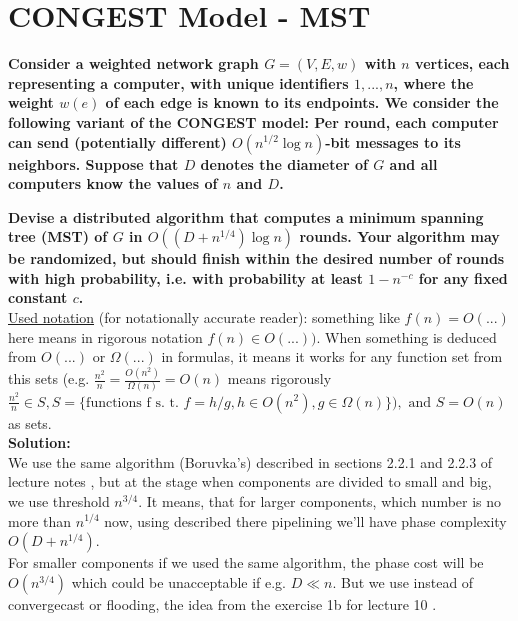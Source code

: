 \documentclass[]{article}
\title{}
\author{}
\begin{document}
\section*{CONGEST Model - MST}
\textbf{Consider a weighted network graph $G = (V,E,w)$ with $n$ vertices, each representing a computer, with unique identifiers $1,...,n$, where the weight $w(e)$ of each edge is known to its endpoints. We consider the following variant of the CONGEST model: Per round, each computer can send (potentially different) $O( n^{1/2}  \log n)$-bit messages to its neighbors. Suppose that $D$ denotes the diameter of $G$ and all computers know the values of $n$ and $D$.}

\textbf{Devise a distributed algorithm that computes a minimum spanning tree (MST) of $G$ in $O((D + n^{1/4})\log n)$ rounds. Your algorithm may be randomized, but should finish within the desired number of rounds with high probability, i.e. with probability at least $1 - n^{-c}$ for any fixed constant $c$.}\\

\underline{Used notation} (for notationally accurate reader): something like $f(n)=O(...)$ here means in rigorous notation $f(n) \in O(...))$. When something is deduced from $O(...)$ or $\Omega(...)$ in formulas, it means it works for any function set from this sets (e.g. $\frac{n^2}{n} = \frac{O(n^2)}{\Omega(n)}=O(n)$ means rigorously $\frac{n^2}{n} \in S, S = \{\text{functions f s. t. }f=h/g, h\in O(n^2), g\in \Omega(n)\}), \text{ and } S = O(n)$ as sets.\\

\textbf{Solution:}\\
We use the same algorithm (Boruvka's) described in sections 2.2.1 and 2.2.3 of lecture notes \cite{Ghaffari}, but at the stage when components are divided to small and big, we use threshold $n^{3/4}$. It means, that for larger components, which number is no more than $n^{1/4}$ now, using described there pipelining we'll have phase complexity $O(D+n^{1/4})$.\\

For smaller components if we used the same algorithm, the phase cost will be $O(n^{3/4})$ which could be unacceptable if e.g. $D\ll n$. But we use instead of convergecast or flooding, the idea from the exercise 1b for lecture 10 \cite{ex10, sol10}.\\
\end{document}
